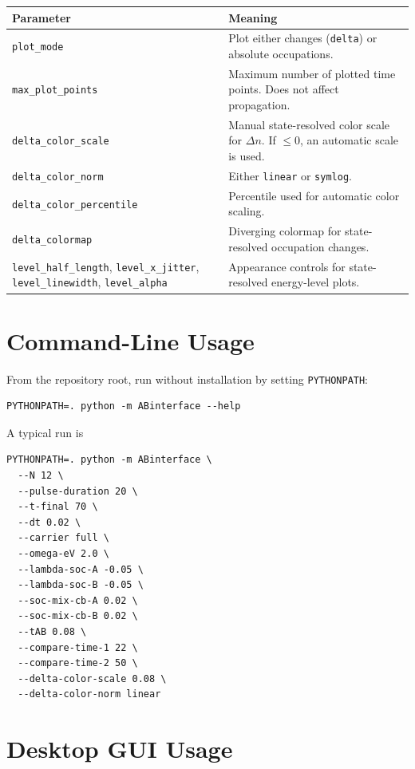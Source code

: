 \documentclass[11pt,a4paper]{article}
\begin{document}
\begin{longtable}{p{}p{}}
\toprule
Parameter & Meaning \\
\midrule
\texttt{plot\_mode} & Plot either changes (\texttt{delta}) or absolute occupations. \\
\texttt{max\_plot\_points} & Maximum number of plotted time points.  Does not affect propagation. \\
\texttt{delta\_color\_scale} & Manual state-resolved color scale for $\Delta n$.  If $\le 0$, an automatic scale is used. \\
\texttt{delta\_color\_norm} & Either \texttt{linear} or \texttt{symlog}. \\
\texttt{delta\_color\_percentile} & Percentile used for automatic color scaling. \\
\texttt{delta\_colormap} & Diverging colormap for state-resolved occupation changes. \\
\texttt{level\_half\_length}, \texttt{level\_x\_jitter}, \texttt{level\_linewidth}, \texttt{level\_alpha} & Appearance controls for state-resolved energy-level plots. \\
\bottomrule
\end{longtable}

\section{Command-Line Usage}

From the repository root, run without installation by setting \texttt{PYTHONPATH}:
\begin{lstlisting}
PYTHONPATH=. python -m ABinterface --help
\end{lstlisting}
A typical run is
\begin{lstlisting}
PYTHONPATH=. python -m ABinterface \
  --N 12 \
  --pulse-duration 20 \
  --t-final 70 \
  --dt 0.02 \
  --carrier full \
  --omega-eV 2.0 \
  --lambda-soc-A -0.05 \
  --lambda-soc-B -0.05 \
  --soc-mix-cb-A 0.02 \
  --soc-mix-cb-B 0.02 \
  --tAB 0.08 \
  --compare-time-1 22 \
  --compare-time-2 50 \
  --delta-color-scale 0.08 \
  --delta-color-norm linear
\end{lstlisting}

\section{Desktop GUI Usage}
\end{document}
